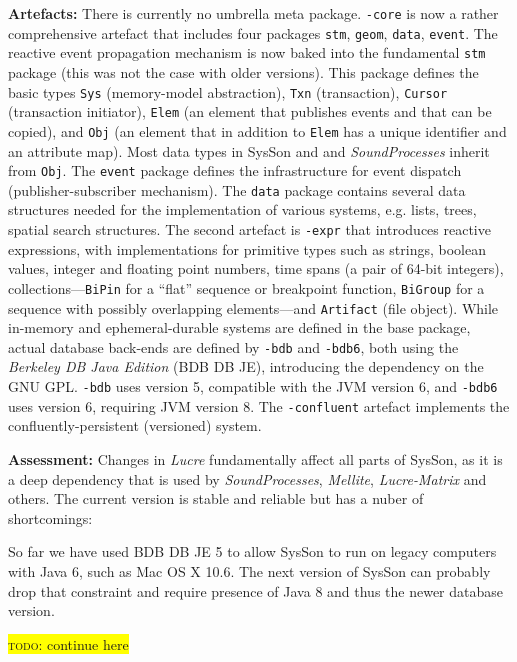 \documentclass[11pt,a4paper]{article}
\newcommand{\todo}[1]{\colorbox{yellow}{\textsc{todo}: #1}}
\newcommand{\software}[1]{\textit{#1}}
\newcommand{\sysson}[0]{SysSon}
\begin{document}
\textbf{Artefacts:} There is currently no umbrella meta package. \verb!-core! is now a rather comprehensive artefact that includes four packages \verb!stm!, \verb!geom!, \verb!data!, \verb!event!. The reactive event propagation mechanism is now baked into the fundamental \verb!stm! package (this was not the case with older versions). This package defines the basic types \verb!Sys! (memory-model abstraction), \verb!Txn! (transaction), \verb!Cursor! (transaction initiator), \verb!Elem! (an element that publishes events and that can be copied), and \verb!Obj! (an element that in addition to \verb!Elem! has a unique identifier and an attribute map). Most data types in \sysson{} and and \software{SoundProcesses} inherit from \verb!Obj!. The \verb!event! package defines the infrastructure for event dispatch (publisher-subscriber mechanism). The \verb!data! package contains several data structures needed for the implementation of various systems, e.g. lists, trees, spatial search structures. The second artefact is \verb!-expr! that introduces reactive expressions, with implementations for primitive types such as strings, boolean values, integer and floating point numbers, time spans (a pair of 64-bit integers), collections---\verb!BiPin! for a ``flat'' sequence or breakpoint function, \verb!BiGroup! for a sequence with possibly overlapping elements---and \verb!Artifact! (file object). While in-memory and ephemeral-durable systems are defined in the base package, actual database back-ends are defined by \verb!-bdb! and \verb!-bdb6!, both using the \software{Berkeley DB Java Edition} (BDB DB JE), introducing the dependency on the GNU GPL. \verb!-bdb! uses version 5, compatible with the JVM version 6, and \verb!-bdb6! uses version 6, requiring JVM version 8. The \verb!-confluent! artefact implements the confluently-persistent (versioned) system.

\textbf{Assessment:} Changes in \software{Lucre} fundamentally affect all parts of \sysson{}, as it is a deep dependency that is used by \software{SoundProcesses}, \software{Mellite}, \software{Lucre-Matrix} and others. The current version is stable and reliable but has a nuber of shortcomings: 

 So far we have used BDB DB JE 5 to allow \sysson{} to run on legacy computers with Java 6, such as Mac OS X 10.6. The next version of \sysson{} can probably drop that constraint and require presence of Java 8 and thus the newer database version.

\todo{continue here}

\printbibliography
\end{document}
